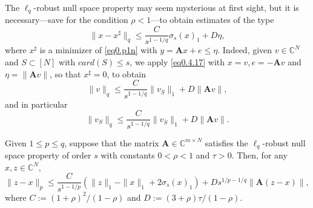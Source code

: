 \begin{remark}
    \label{rmk0.4.24}
    The $\ell_q$-robust null space property may seem mysterious at first sight, but it is necessary---save for the condition $\rho<1$---to obtain estimates of the type
    \begin{equation}
        \|x-x^{\sharp}\|_q \leq \frac{C}{s^{1-1/q}} \sigma_s(x)_1 + D \eta,
        \label{eq0.4.17}
    \end{equation}
    where $x^{\sharp}$ is a minimizer of \cref{eq0.p1n} with $y = \mathbf{A}x + e \leq \eta$. Indeed, given $v \in \mathbb{C}^N$ and $S \subset [N]$ with $card(S) \leq s$, we apply \cref{eq0.4.17} with $x=v, e= -\mathbf{A}v$ and $\eta=\|\mathbf{A}v\|$, so that $x^{\sharp} = 0$, to obtain
    \[
        \|v\|_q \leq \frac{C}{s^{1-1/q}} \|v_{\overline{S}}\|_1 + D \|\mathbf{A}v\|,
    \]
    and in particular
    \[
        \|v_S\|_q \leq \frac{C}{s^{1-1/q}} \|v_{\overline{S}}\|_1 + D \|\mathbf{A}v\|.
    \]
\end{remark}

\begin{theorem}
    \label{th0.4.25}
    Given $1 \leq p \leq q$, suppose that the matrix $\mathbf{A} \in \mathbb{C}^{m \times N}$ satisfies the $\ell_q$-robust null space property of order $s$ with constants $0<\rho<1$ and $\tau > 0$. Then, for any $x,z \in \mathbb{C}^N$,
    \[
        \|z-x\|_p \leq \frac{C}{s^{1-1/p}}\left( \|z\|_1 - \|x\|_1 + 2\sigma_s(x)_1 \right) + D s^{1/p-1/q} \|\mathbf{A}(z-x)\|,
    \]
    where $C := (1+\rho)^2/(1-\rho)$ and $D := (3+\rho)\tau/(1-\rho)$.
\end{theorem}

